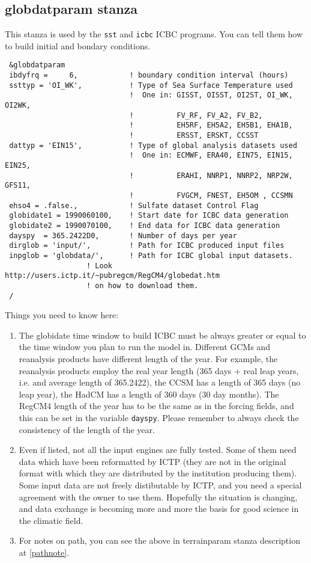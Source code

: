 \subsection{globdatparam stanza}

This stanza is used by the \verb=sst= and \verb=icbc= ICBC programs. You can
tell them how to build initial and bondary conditions.

{\footnotesize
\begin{Verbatim}
 &globdatparam
 ibdyfrq =     6,            ! boundary condition interval (hours)
 ssttyp = 'OI_WK',           ! Type of Sea Surface Temperature used
                             !  One in: GISST, OISST, OI2ST, OI_WK, OI2WK,
                             !          FV_RF, FV_A2, FV_B2,
                             !          EH5RF, EH5A2, EH5B1, EHA1B,
                             !          ERSST, ERSKT, CCSST
 dattyp = 'EIN15',           ! Type of global analysis datasets used
                             !  One in: ECMWF, ERA40, EIN75, EIN15, EIN25,
                             !          ERAHI, NNRP1, NNRP2, NRP2W, GFS11,
                             !          FVGCM, FNEST, EH5OM , CCSMN
 ehso4 = .false.,            ! Sulfate dataset Control Flag
 globidate1 = 1990060100,    ! Start date for ICBC data generation
 globidate2 = 1990070100,    ! End data for ICBC data generation
 dayspy  = 365.2422D0,       ! Number of days per year
 dirglob = 'input/',         ! Path for ICBC produced input files
 inpglob = 'globdata/',      ! Path for ICBC global input datasets.
                   ! Look http://users.ictp.it/~pubregcm/RegCM4/globedat.htm
                   ! on how to download them.
 /
\end{Verbatim}
}

Things you need to know here:

\begin{enumerate}
\item The globidate time window to build ICBC must be always greater or equal to
the time window you plan to run the model in.
Different GCMs and reanalysis products have different length of the year.
For example, the reanalysis products employ the real year length (365 days +
real leap years, i.e. and average length of 365.2422), the CCSM has a length
of 365 days (no leap year), the HadCM has a length of 360 days (30 day months).
The RegCM4 length of the year has to be the same as in the forcing fields, and
this can be set in the variable \verb=dayspy=.
Please remember to always check the consistency of the length of the year.
\item Even if listed, not all the input engines are fully tested. Some of them
need data which have been reformatted by ICTP (they are not in the original
format with which they are distributed by the institution producing them).
Some input data are not freely distibutable by ICTP, and you need a special
agreement with the owner to use them.
Hopefully the situation is changing, and data exchange is becoming more and more
the basis for good science in the climatic field.
\item For notes on path, you can see the above in terrainparam stanza
description at \ref{pathnote}.
\end{enumerate}

